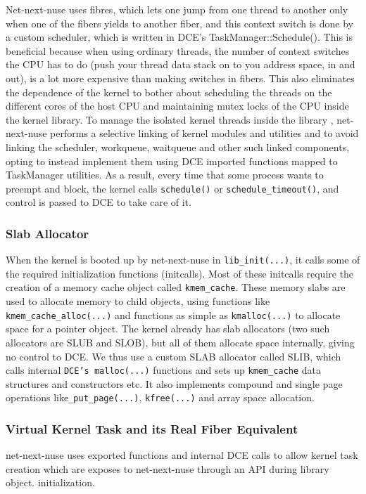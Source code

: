\documentclass{sig-alternate}
\begin{document}
Net-next-nuse uses fibres, which lets one jump from one thread to another only when one of the fibers yields to another fiber, and this context switch 
is done by a custom scheduler, which is written in DCE's TaskManager::Schedule(). This is beneficial because when using ordinary threads, 
the number of context switches the CPU has to do (push your thread data stack on to you address space, in and out), 
is a lot more expensive than making switches in fibers. This also eliminates the dependence of the kernel to bother about scheduling the threads on 
the different cores of the host CPU and maintaining mutex locks of the CPU inside the kernel library. To manage the isolated kernel threads inside the library , 
net-next-nuse  performs  a selective linking of 
kernel modules and utilities and to avoid linking the scheduler, workqueue, waitqueue and other such linked components, opting to instead implement
them using DCE imported functions mapped to TaskManager utilities. As a result, every time that some process wants to preempt and block, the kernel calls 
\texttt{schedule()} or \texttt{schedule\_timeout()}, and control is passed to DCE to take care of it. 

\subsubsection{Slab Allocator}
\sloppy When the kernel is booted up by net-next-nuse in \texttt{lib\_init(...)}, it calls some of the required initialization functions (initcalls). 
Most of these initcalls require the creation of a memory cache object called \texttt{kmem\_cache}. These memory slabs are used to allocate memory to child 
objects, using functions like \texttt{kmem\_cache\_alloc(...)} and functions as simple as \texttt{kmalloc(...)} to allocate space for a pointer object. The 
kernel already has slab allocators (two such allocators are SLUB and SLOB), but all of them allocate space internally, giving no control to DCE. We thus use a custom 
SLAB allocator called SLIB, which calls internal \texttt{DCE's malloc(...)} functions and sets up \texttt{kmem\_cache} data structures and constructors etc. It also 
implements compound and single page operations like\texttt{\_put\_page(...)}, \texttt{kfree(...)} and array space allocation. 

\subsubsection{Virtual Kernel Task and its Real Fiber Equivalent}
net-next-nuse uses exported functions and internal DCE calls to allow kernel task creation  which are exposes to net-next-nuse through an API during library object.
initialization.
\end{document}

